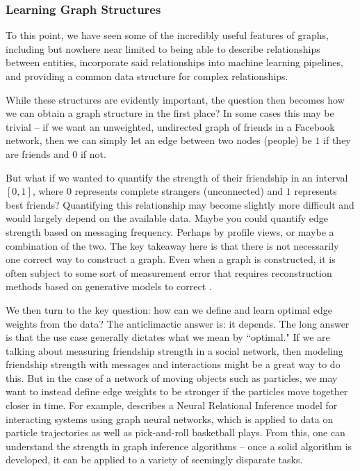 \documentclass{article}
\theoremstyle{definition}
\begin{document}
\subsubsection{Learning Graph Structures}

To this point, we have seen some of the incredibly useful features of graphs, including but nowhere near limited to being able to describe relationships between entities, incorporate said relationships into machine learning pipelines, and providing a common data structure for complex relationships.

While these structures are evidently important, the question then becomes how we can obtain a graph structure in the first place? In some cases this may be trivial -- if we want an unweighted, undirected graph of friends in a Facebook network, then we can simply let an edge between two nodes (people) be $1$ if they are friends and $0$ if not.

But what if we wanted to quantify the strength of their friendship in an interval $[0,1]$, where $0$ represents complete strangers (unconnected) and $1$ represents best friends? Quantifying this relationship may become slightly more difficult and would largely depend on the available data. Maybe you could quantify edge strength based on messaging frequency. Perhaps by profile views, or maybe a combination of the two. The key takeaway here is that there is not necessarily one correct way to construct a graph. Even when a graph is constructed, it is often subject to some sort of measurement error that requires reconstruction methods based on generative models to correct \cite{PhysRevReconstructingNetworksErrors}.

We then turn to the key question: how can we define and learn optimal edge weights from the data? The anticlimactic answer is: it depends. The long answer is that the use case generally dictates what we mean by ``optimal." If we are talking about measuring friendship strength in a social network, then modeling friendship strength with messages and interactions might be a great way to do this. But in the case of a network of moving objects such as particles, we may want to instead define edge weights to be stronger if the particles move together closer in time. For example, \cite{kipf2018NRI} describes a Neural Relational Inference model for interacting systems using graph neural networks, which is applied to data on particle trajectories as well as pick-and-roll basketball plays. From this, one can understand the strength in graph inference algorithms -- once a solid algorithm is developed, it can be applied to a variety of seemingly disparate tasks.
\end{document}
